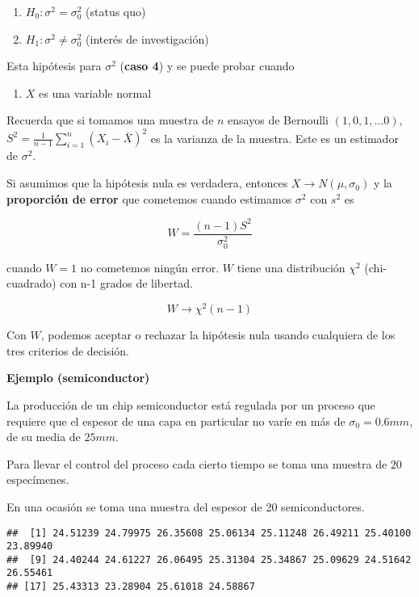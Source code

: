 \documentclass[
]{book}
\providecommand{\tightlist}{%
  \setlength{\itemsep}{0pt}\setlength{\parskip}{0pt}}
\begin{document}
\begin{enumerate}
\def\labelenumi{\alph{enumi}.}
\tightlist
\item
  \(H_0:\sigma^2 = \sigma^2_0\) (status quo)
\item
  \(H_1:\sigma^2 \neq \sigma^2_0\) (interés de investigación)
\end{enumerate}

Esta hipótesis para \(\sigma^2\) (\textbf{caso 4}) y se puede probar cuando

\begin{enumerate}
\def\labelenumi{\arabic{enumi}.}
\tightlist
\item
  \(X\) es una variable normal
\end{enumerate}

Recuerda que si tomamos una muestra de \(n\) ensayos de Bernoulli \((1,0,1,...0)\), \(S^2=\frac{1}{n-1}\sum_{i=1 }^n (X_i-\bar{X})^2\) es la varianza de la muestra. Este es un estimador de \(\sigma^2\).

Si asumimos que la hipótesis nula es verdadera, entonces \(X \rightarrow N(\mu, \sigma_0)\) y la \textbf{proporción de error} que cometemos cuando estimamos \(\sigma^2\) con \(s^2\) es

\[W=\frac{(n-1)S^2}{\sigma_0^2}\]

cuando \(W=1\) no cometemos ningún error. \(W\) tiene una distribución \(\chi^2\) (chi-cuadrado) con n-1 grados de libertad.

\[W \rightarrow \chi^2(n-1)\]

Con \(W\), podemos aceptar o rechazar la hipótesis nula usando cualquiera de los tres criterios de decisión.

\textbf{Ejemplo (semiconductor)}

La producción de un chip semiconductor está regulada por un proceso que requiere que el espesor de una capa en particular no varíe en más de \(\sigma_0=0.6mm\), de su media de \(25mm\).

Para llevar el control del proceso cada cierto tiempo se toma una muestra de \(20\) especímenes.

En una ocasión se toma una muestra del espesor de 20 semiconductores.

\begin{verbatim}
##  [1] 24.51239 24.79975 26.35608 25.06134 25.11248 26.49211 25.40100 23.89940
##  [9] 24.40244 24.61227 26.06495 25.31304 25.34867 25.09629 24.51642 26.55461
## [17] 25.43313 23.28904 25.61018 24.58867
\end{verbatim}
\end{document}
